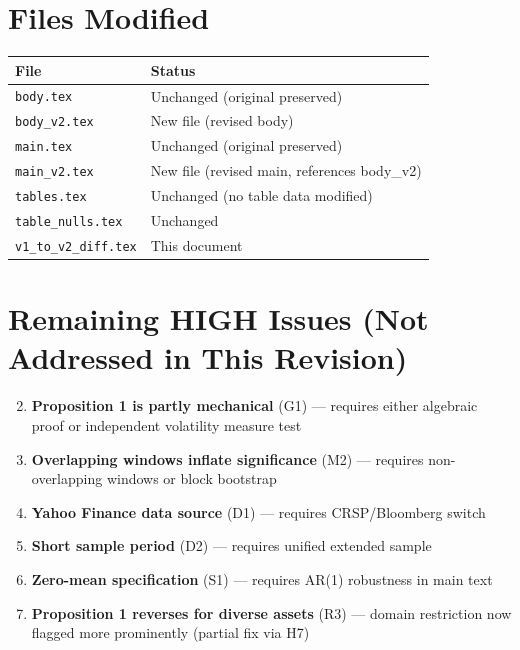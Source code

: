 \documentclass[12pt,a4paper]{article}
\begin{document}
\section*{Files Modified}

\begin{tabular}{ll}
\toprule
File & Status \\
\midrule
\texttt{body.tex} & Unchanged (original preserved) \\
\texttt{body\_v2.tex} & New file (revised body) \\
\texttt{main.tex} & Unchanged (original preserved) \\
\texttt{main\_v2.tex} & New file (revised main, references body\_v2) \\
\texttt{tables.tex} & Unchanged (no table data modified) \\
\texttt{table\_nulls.tex} & Unchanged \\
\texttt{v1\_to\_v2\_diff.tex} & This document \\
\bottomrule
\end{tabular}

\vspace{1em}

\section*{Remaining HIGH Issues (Not Addressed in This Revision)}

\begin{enumerate}[label=H\arabic*.]
\setcounter{enumi}{1}
\item \textbf{Proposition 1 is partly mechanical} (G1) --- requires either algebraic proof or independent volatility measure test
\setcounter{enumi}{3}
\item \textbf{Overlapping windows inflate significance} (M2) --- requires non-overlapping windows or block bootstrap
\item \textbf{Yahoo Finance data source} (D1) --- requires CRSP/Bloomberg switch
\item \textbf{Short sample period} (D2) --- requires unified extended sample
\setcounter{enumi}{7}
\item \textbf{Zero-mean specification} (S1) --- requires AR(1) robustness in main text
\item \textbf{Proposition 1 reverses for diverse assets} (R3) --- domain restriction now flagged more prominently (partial fix via H7)
\end{enumerate}
\end{document}
